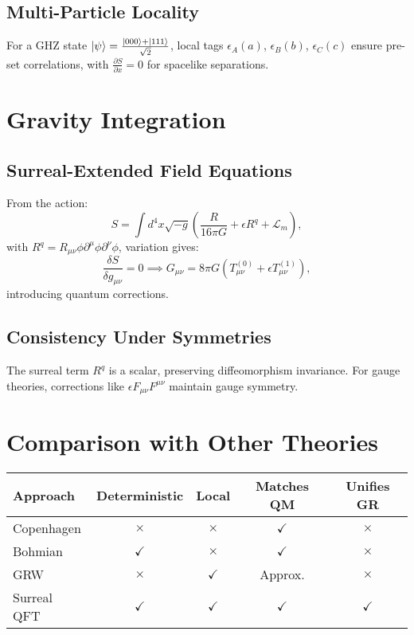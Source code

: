 \documentclass{article}
\begin{document}
\subsection{Multi-Particle Locality}
For a GHZ state \(\ket{\psi} = \frac{\ket{000} + \ket{111}}{\sqrt{2}}\), local tags \(\epsilon_A(a)\), \(\epsilon_B(b)\), \(\epsilon_C(c)\) ensure pre-set correlations, with \(\frac{\partial S}{\partial x} = 0\) for spacelike separations.

\section{Gravity Integration}
\subsection{Surreal-Extended Field Equations}
From the action:
\begin{equation}
S = \int d^4x \sqrt{-g} \left( \frac{R}{16\pi G} + \epsilon R^q + \mathcal{L}_m \right),
\end{equation}
with \(R^q = R_{\mu\nu} \phi \partial^\mu \phi \partial^\nu \phi\), variation gives:
\begin{equation}
\frac{\delta S}{\delta g_{\mu\nu}} = 0 \implies G_{\mu\nu} = 8\pi G \left( T_{\mu\nu}^{(0)} + \epsilon T_{\mu\nu}^{(1)} \right),
\end{equation}
introducing quantum corrections.

\subsection{Consistency Under Symmetries}
The surreal term \(R^q\) is a scalar, preserving diffeomorphism invariance. For gauge theories, corrections like \(\epsilon F_{\mu\nu} F^{\mu\nu}\) maintain gauge symmetry.

\section{Comparison with Other Theories}
\begin{center}
\begin{tabular}{lcccc}
\hline
\textbf{Approach} & \textbf{Deterministic} & \textbf{Local} & \textbf{Matches QM} & \textbf{Unifies GR} \\
\hline
Copenhagen & $\times$ & $\times$ & $\checkmark$ & $\times$ \\
Bohmian & $\checkmark$ & $\times$ & $\checkmark$ & $\times$ \\
GRW & $\times$ & $\checkmark$ & Approx. & $\times$ \\
Surreal QFT & $\checkmark$ & $\checkmark$ & $\checkmark$ & $\checkmark$ \\
\hline
\end{tabular}
\end{center}
\end{document}
